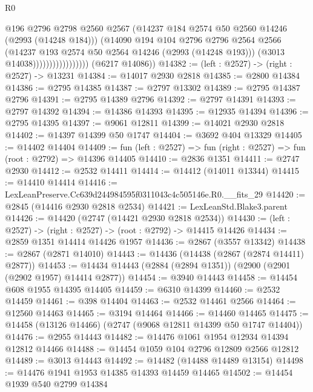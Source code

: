 \begin{lexlean}{R0}
\begin{coremodule}
                                    @196
                                    @2796
                                    @2798
                                    @2560
                                    @2567
                                    (@14237 @184 @2574 @50 @2560 @14246 (@2993 (@14248 @184)))
                                    (@14090
                                      @194
                                      @104
                                      @2796
                                      @2796
                                      @2564
                                      @2566
                                      (@14237 @193 @2574 @50 @2564 @14246 (@2993 (@14248 @193)))
                                      (@3013 @14038)))))))))))))))))
      (@6217 @14086))
@14382 := (left : @2527) -> (right : @2527) -> @13231
@14384 := @14017 @2930 @2818
@14385 := @2800 @14384
@14386 := @2795 @14385
@14387 := @2797 @13302
@14389 := @2795 @14387 @2796
@14391 := @2795 @14389 @2796
@14392 := @2797 @14391
@14393 := @2797 @14392
@14394 := @14386 @14393
@14395 := @12935 @14394
@14396 := @2795 @14395
@14397 := @9061 @12811
@14399 := @14021 @2930 @2818
@14402 := @14397 @14399 @50 @1747
@14404 := @3692 @404 @13329
@14405 := @14402 @14404
@14409 := fun (left : @2527) => fun (right : @2527) => fun (root : @2792) => @14396 @14405
@14410 := @2836 @1351
@14411 := @2747 @2930
@14412 := @2532 @14411
@14414 := @14412 (@14011 @13344)
@14415 := @14410 @14414
@14416 := LexLeanPreserve.Cc639d244984595f0311043c4c505146e.R0.__fits_29
@14420 := @2845 (@14416 @2930 @2818 @2534)
@14421 := LexLeanStd.Blake3.parent
@14426 := @14420 (@2747 (@14421 @2930 @2818 @2534))
@14430 := (left : @2527) -> (right : @2527) -> (root : @2792) -> @14415 @14426
@14434 := @2859 @1351 @14414 @14426 @1957
@14436 := @2867 (@3557 @13342)
@14438 := @2867 (@2871 @14010)
@14443 := @14436 (@14438 (@2867 (@2874 @14411) @2877))
@14453 := @14434 @14443 (@2884 (@2894 @1351)) (@2900 (@2901 (@2902 @1957) @14414 @2877))
@14454 := @3940 @14443
@14458 := @14454 @608 @1955 @14395 @14405
@14459 := @6310 @14399
@14460 := @2532 @14459
@14461 := @398 @14404
@14463 := @2532 @14461 @2566
@14464 := @12560 @14463
@14465 := @3194 @14464
@14466 := @14460 @14465
@14475 := @14458 (@13126 @14466) (@2747 (@9068 @12811 @14399 @50 @1747 @14404))
@14476 := @2955 @14443
@14482 := @14476 @1061 @1954 @12934 @14394 @12812 @14466
@14488 := @14454 @1059 @104 @2796 @12809 @2566 @12812
@14489 := @3013 @14443
@14492 := @14482 (@14488 @14489 @13154)
@14498 := @14476 @1941 @1953 @14385 @14393 @14459 @14465
@14502 := @14454 @1939 @540 @2799 @14384

\end{coremodule}
\end{lexlean}
